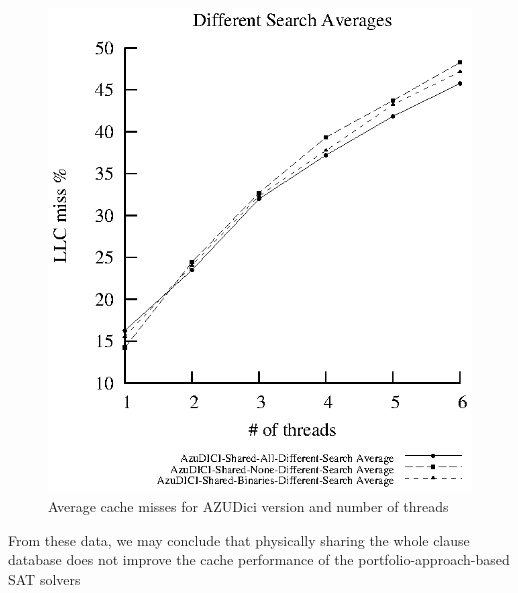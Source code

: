 \begin{figure}[htp]
  \centering
  \includegraphics[scale=1]{averageDS}
  \caption{Average cache misses for AZUDici version and number of
    threads}
  \label{fig:dscachemisses}
\end{figure}

From these data, we may conclude that physically sharing the whole
clause database does not improve the cache performance of the
portfolio-approach-based SAT solvers


